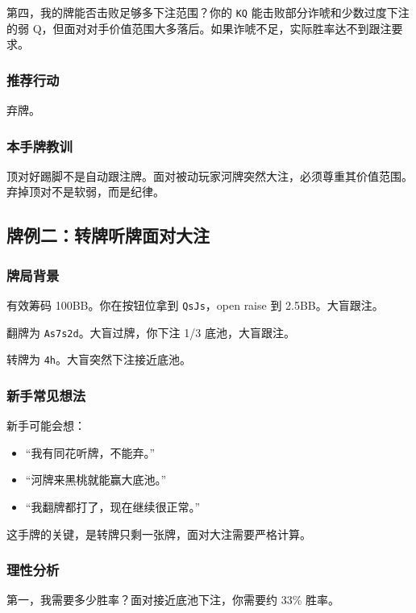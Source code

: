 第四，我的牌能否击败足够多下注范围？你的 \texttt{KQ} 能击败部分诈唬和少数过度下注的弱 Q，但面对对手价值范围大多落后。如果诈唬不足，实际胜率达不到跟注要求。

\subsubsection*{推荐行动}

弃牌。

\subsubsection*{本手牌教训}

顶对好踢脚不是自动跟注牌。面对被动玩家河牌突然大注，必须尊重其价值范围。弃掉顶对不是软弱，而是纪律。

\subsection{牌例二：转牌听牌面对大注}

\subsubsection*{牌局背景}

有效筹码 100BB。你在按钮位拿到 \texttt{QsJs}，open raise 到 2.5BB。大盲跟注。

翻牌为 \texttt{As7s2d}。大盲过牌，你下注 1/3 底池，大盲跟注。

转牌为 \texttt{4h}。大盲突然下注接近底池。

\subsubsection*{新手常见想法}

新手可能会想：

\begin{itemize}
\item “我有同花听牌，不能弃。”
\item “河牌来黑桃就能赢大底池。”
\item “我翻牌都打了，现在继续很正常。”
\end{itemize}

这手牌的关键，是转牌只剩一张牌，面对大注需要严格计算。

\subsubsection*{理性分析}

第一，我需要多少胜率？面对接近底池下注，你需要约 33\% 胜率。

